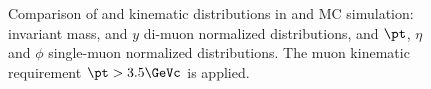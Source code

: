 \begin{figure}[h]
\begin{center}
    \caption{Comparison of \PgUa and \PgUb kinematic distributions in \PbPb and \pp MC simulation: 
invariant mass, \pt and $y$ di-muon normalized distributions, and 
$\pt$, $\eta$ and $\phi$ single-muon normalized distributions.
The muon kinematic requirement $\pt > 3.5\GeVc$ is applied. 
}
    \label{fig:muon_properties_3_5}
  \end{center}
\end{figure}


